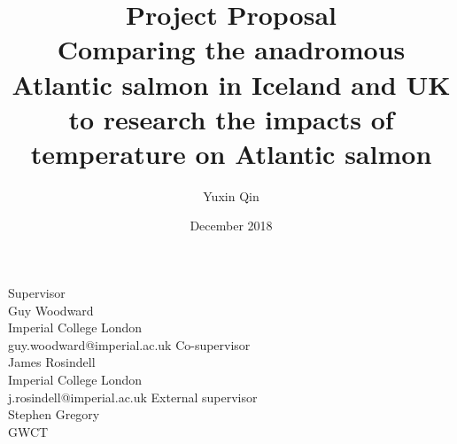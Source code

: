 \documentclass[11pt]{article}
\title{%
 Project Proposal\\
 \LARGE Comparing the anadromous Atlantic salmon in Iceland and UK to research the impacts of temperature on Atlantic salmon}
\author{Yuxin Qin }
\date{December 2018}
\begin{document}
\maketitle
\begin{center}
    \Large Supervisor\\
    Guy Woodward\\
    Imperial College London\\
    guy.woodward@imperial.ac.uk
    \bigbreak
    \Large Co-supervisor\\
    James Rosindell\\
    Imperial College London\\
    j.rosindell@imperial.ac.uk
    \bigbreak
    \Large External supervisor\\
    Stephen Gregory\\
    GWCT
\end{center}
\end{document}

